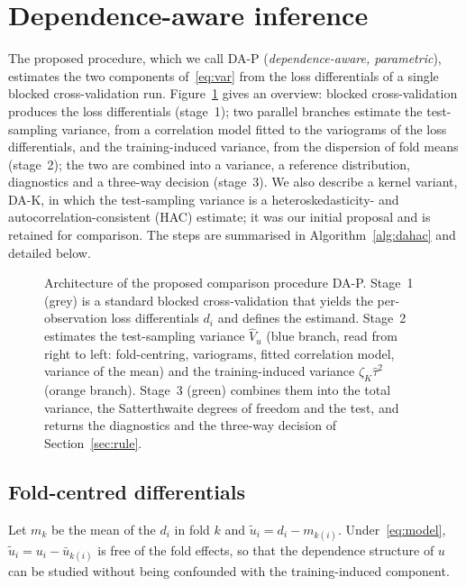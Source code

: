 \section{Dependence-aware inference}\label{sec:method}

The proposed procedure, which we call DA-P (\emph{dependence-aware, parametric}), estimates the two components of~\eqref{eq:var} from the loss differentials of a single blocked cross-validation run. Figure~\ref{fig:architecture} gives an overview: blocked cross-validation produces the loss differentials (stage~1); two parallel branches estimate the test-sampling variance, from a correlation model fitted to the variograms of the loss differentials, and the training-induced variance, from the dispersion of fold means (stage~2); the two are combined into a variance, a reference distribution, diagnostics and a three-way decision (stage~3). We also describe a kernel variant, DA-K, in which the test-sampling variance is a heteroskedasticity- and autocorrelation-consistent (HAC) estimate; it was our initial proposal and is retained for comparison. The steps are summarised in Algorithm~\ref{alg:dahac} and detailed below.

\begin{figure}[t]
\centering
\resizebox{\textwidth}{!}{}
\caption{Architecture of the proposed comparison procedure DA-P. Stage~1 (grey) is a standard blocked cross-validation that yields the per-observation loss differentials $d_i$ and defines the estimand. Stage~2 estimates the test-sampling variance $\hat V_u$ (blue branch, read from right to left: fold-centring, variograms, fitted correlation model, variance of the mean) and the training-induced variance $\zeta_K\hat\tau^2$ (orange branch). Stage~3 (green) combines them into the total variance, the Satterthwaite degrees of freedom and the test, and returns the diagnostics and the three-way decision of Section~\ref{sec:rule}.}\label{fig:architecture}
\end{figure}

\subsection{Fold-centred differentials}

Let $m_k$ be the mean of the $d_i$ in fold $k$ and $\tilde u_i=d_i-m_{k(i)}$. Under~\eqref{eq:model}, $\tilde u_i=u_i-\bar u_{k(i)}$ is free of the fold effects, so that the dependence structure of $u$ can be studied without being confounded with the training-induced component.

